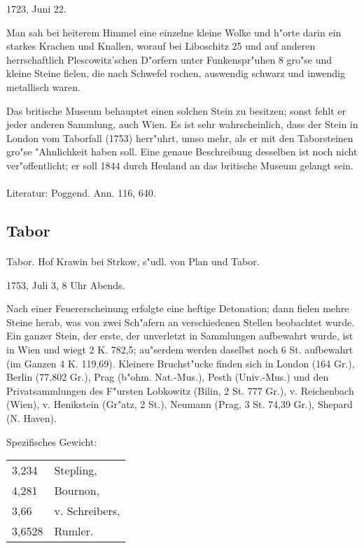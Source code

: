 \documentclass[a4paper, 11pt, oneside]{article}
\begin{document}
1723, Juni 22.

Man sah bei heiterem Himmel eine einzelne kleine Wolke und h"orte darin ein starkes Krachen und Knallen, worauf bei Liboschitz 25 und auf anderen herrschaftlich Plescowitz'schen D"orfern unter Funkenspr"uhen 8 gro"se und kleine Steine fielen, die nach Schwefel rochen, auswendig schwarz und inwendig metallisch waren.

Das britische Museum behauptet einen solchen Stein zu besitzen; sonst fehlt er jeder anderen Sammlung, auch Wien. Es ist sehr wahrscheinlich, dass der Stein in London vom Taborfall (1753) herr"uhrt, umso mehr, als er mit den Taborsteinen gro"se "Ahnlichkeit haben soll. Eine genaue Beschreibung desselben ist noch nicht ver"offentlicht; er soll 1844 durch Heuland an das britische Museum gelangt sein.
\footnotesize
\paragraph{}
Literatur: Poggend. Ann. 116, 640.
\subsection{Tabor}
\normalsize
\paragraph{}
Tabor. Hof Krawin bei Strkow, s"udl. von Plan und Tabor.

1753, Juli 3, 8 Uhr Abends.

Nach einer Feuererscheinung erfolgte eine heftige Detonation; dann fielen mehre Steine herab, was von zwei Sch"afern an verschiedenen Stellen beobachtet wurde. Ein ganzer Stein, der erste, der unverletzt in Sammlungen aufbewahrt wurde, ist in Wien und wiegt 2 K. 782,5; au"serdem werden daselbst noch 6 St. aufbewahrt (im Ganzen 4 K. 119,69). Kleinere Bruchst"ucke finden sich in London (164 Gr.), Berlin (77,802 Gr.), Prag (b"ohm. Nat.-Mus.), Pesth (Univ.-Mus.) und den Privatsammlungen des F"ursten Lobkowitz (Bilin, 2 St. 777 Gr.), v. Reichenbach (Wien), v. Henikstein (Gr"atz, 2 St.), Neumann (Prag, 3 St. 74,39 Gr.), Shepard (N. Haven).

Spezifisches Gewicht:
\begin{table}[!ht]
    \centering
    \begin{tabular}{l l}
        3,234 & Stepling,\\
        4,281 & Bournon,\\
        3,66 & v. Schreibers,\\
        3,6528 & Rumler.
    \end{tabular}
\end{table}
\end{document}
